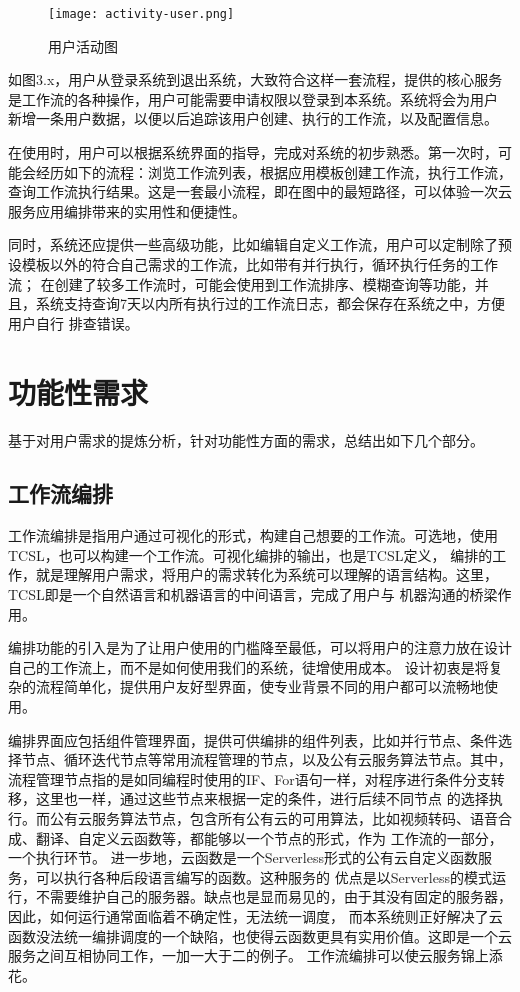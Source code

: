 \begin{figure}[H]
    \centering
    \texttt{[image: activity-user.png]}
    \caption{用户活动图}
    \label{fig:yhhd}
    \note{}
\end{figure}

如图3.x，用户从登录系统到退出系统，大致符合这样一套流程，提供的核心服务是工作流的各种操作，用户可能需要申请权限以登录到本系统。系统将会为用户
新增一条用户数据，以便以后追踪该用户创建、执行的工作流，以及配置信息。

在使用时，用户可以根据系统界面的指导，完成对系统的初步熟悉。第一次时，可能会经历如下的流程：浏览工作流列表，根据应用模板创建工作流，执行工作流，
查询工作流执行结果。这是一套最小流程，即在图中的最短路径，可以体验一次云服务应用编排带来的实用性和便捷性。

同时，系统还应提供一些高级功能，比如编辑自定义工作流，用户可以定制除了预设模板以外的符合自己需求的工作流，比如带有并行执行，循环执行任务的工作流；
在创建了较多工作流时，可能会使用到工作流排序、模糊查询等功能，并且，系统支持查询7天以内所有执行过的工作流日志，都会保存在系统之中，方便用户自行
排查错误。



\section{功能性需求}
基于对用户需求的提炼分析，针对功能性方面的需求，总结出如下几个部分。

\subsection{工作流编排}
工作流编排是指用户通过可视化的形式，构建自己想要的工作流。可选地，使用TCSL，也可以构建一个工作流。可视化编排的输出，也是TCSL定义，
编排的工作，就是理解用户需求，将用户的需求转化为系统可以理解的语言结构。这里，TCSL即是一个自然语言和机器语言的中间语言，完成了用户与
机器沟通的桥梁作用。

编排功能的引入是为了让用户使用的门槛降至最低，可以将用户的注意力放在设计自己的工作流上，而不是如何使用我们的系统，徒增使用成本。
设计初衷是将复杂的流程简单化，提供用户友好型界面，使专业背景不同的用户都可以流畅地使用。

编排界面应包括组件管理界面，提供可供编排的组件列表，比如并行节点、条件选择节点、循环迭代节点等常用流程管理的节点，以及公有云服务算法节点。其中，
流程管理节点指的是如同编程时使用的IF、For语句一样，对程序进行条件分支转移，这里也一样，通过这些节点来根据一定的条件，进行后续不同节点
的选择执行。而公有云服务算法节点，包含所有公有云的可用算法，比如视频转码、语音合成、翻译、自定义云函数等，都能够以一个节点的形式，作为
工作流的一部分，一个执行环节。 进一步地，云函数是一个Serverless形式的公有云自定义函数服务，可以执行各种后段语言编写的函数。这种服务的
优点是以Serverless的模式运行，不需要维护自己的服务器。缺点也是显而易见的，由于其没有固定的服务器，因此，如何运行通常面临着不确定性，无法统一调度，
而本系统则正好解决了云函数没法统一编排调度的一个缺陷，也使得云函数更具有实用价值。这即是一个云服务之间互相协同工作，一加一大于二的例子。
工作流编排可以使云服务锦上添花。

